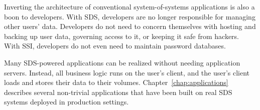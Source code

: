 Inverting the architecture of conventional system-of-systems applications
is also a boon to developers.  With SDS, developers
are no longer responsible for managing other users' data.  Developers do not
need to concern themselves with hosting and backing up user data, governing access to it,
or keeping it safe from hackers.  With SSI, developers do not even need to
maintain password databases.

Many SDS-powered applications can be realized without needing application
servers.  Instead, all business logic runs on the user's client, and the user's
client loads and stores their data to their volumes.
Chapter~\ref{chap:applications} describes several non-trivial applications that
have been built on real SDS systems deployed in production settings.
